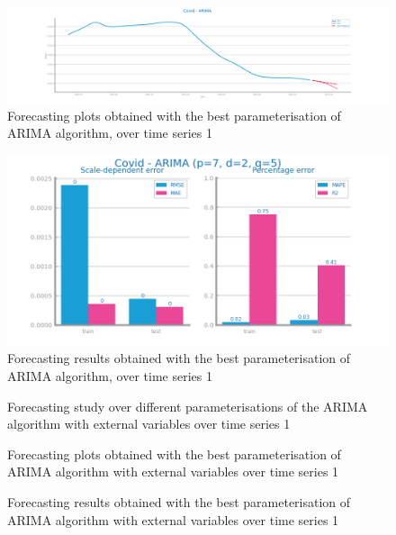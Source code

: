 \documentclass[10pt]{extarticle}
\begin{document}
\begin{figure}[H]
\centering\includegraphics[scale=0.5]{images/dataset1/time_series/Covid - ARIMA _forecasting_series.png}
\caption{Forecasting plots obtained with the best parameterisation of ARIMA algorithm, over time series 1}
\end{figure}

\begin{figure}[H]
\centering\includegraphics[scale=0.5]{images/dataset1/time_series/Covid - ARIMA (p=7, d=2, q=5)_forecasting_eval.png}
\caption{Forecasting results obtained with the best parameterisation of ARIMA algorithm, over time series 1}
\end{figure}

\begin{figure}[H]
\caption{Forecasting study over different parameterisations of the ARIMA algorithm with external variables over time series 1}
\end{figure}

\begin{figure}[H]
\caption{Forecasting plots obtained with the best parameterisation of ARIMA algorithm with external variables over time series 1}
\end{figure}

\begin{figure}[H]
\caption{Forecasting results obtained with the best parameterisation of ARIMA algorithm with external variables over time series 1}
\end{figure}
\end{document}
